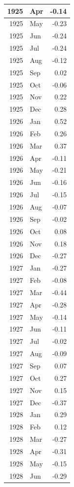 \documentclass[
]{article}
\begin{document}
\begin{table}[H]
\begin{tabular}[t]{r|l|r}
\hline
1925 & Apr & -0.14\\
\hline
1925 & May & -0.23\\
\hline
1925 & Jun & -0.24\\
\hline
1925 & Jul & -0.24\\
\hline
1925 & Aug & -0.12\\
\hline
1925 & Sep & 0.02\\
\hline
1925 & Oct & -0.06\\
\hline
1925 & Nov & 0.22\\
\hline
1925 & Dec & 0.28\\
\hline
1926 & Jan & 0.52\\
\hline
1926 & Feb & 0.26\\
\hline
1926 & Mar & 0.37\\
\hline
1926 & Apr & -0.11\\
\hline
1926 & May & -0.21\\
\hline
1926 & Jun & -0.16\\
\hline
1926 & Jul & -0.15\\
\hline
1926 & Aug & -0.07\\
\hline
1926 & Sep & -0.02\\
\hline
1926 & Oct & 0.08\\
\hline
1926 & Nov & 0.18\\
\hline
1926 & Dec & -0.27\\
\hline
1927 & Jan & -0.27\\
\hline
1927 & Feb & -0.08\\
\hline
1927 & Mar & -0.44\\
\hline
1927 & Apr & -0.28\\
\hline
1927 & May & -0.14\\
\hline
1927 & Jun & -0.11\\
\hline
1927 & Jul & -0.02\\
\hline
1927 & Aug & -0.09\\
\hline
1927 & Sep & 0.07\\
\hline
1927 & Oct & 0.27\\
\hline
1927 & Nov & 0.15\\
\hline
1927 & Dec & -0.37\\
\hline
1928 & Jan & 0.29\\
\hline
1928 & Feb & 0.12\\
\hline
1928 & Mar & -0.27\\
\hline
1928 & Apr & -0.31\\
\hline
1928 & May & -0.15\\
\hline
1928 & Jun & -0.29\\

\end{tabular}
\end{table}
\end{document}
